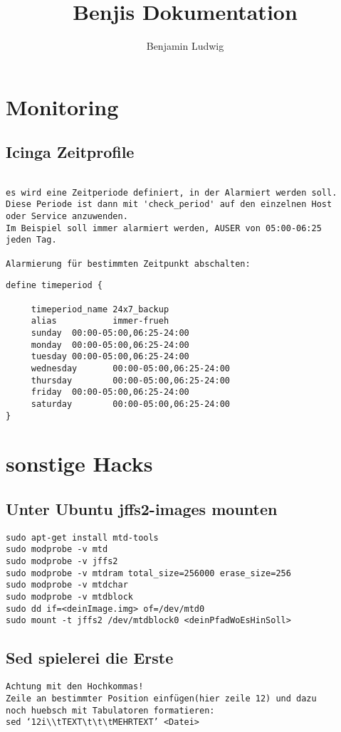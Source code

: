 \documentclass[a4paper,10pt]{report}
\title{Benjis Dokumentation}
\author{Benjamin Ludwig}
\date{}
\begin{document}
 
\maketitle
\tableofcontents
\chapter{Monitoring}
\section{Icinga Zeitprofile}


\begin{verbatim}

es wird eine Zeitperiode definiert, in der Alarmiert werden soll. 
Diese Periode ist dann mit 'check_period' auf den einzelnen Host 
oder Service anzuwenden. 
Im Beispiel soll immer alarmiert werden, AUSER von 05:00-06:25 
jeden Tag. 

Alarmierung für bestimmten Zeitpunkt abschalten:
\end{verbatim}

{\Large
\begin{verbatim}
define timeperiod {

     timeperiod_name 24x7_backup
     alias           immer-frueh
     sunday  00:00-05:00,06:25-24:00
     monday  00:00-05:00,06:25-24:00
     tuesday 00:00-05:00,06:25-24:00
     wednesday       00:00-05:00,06:25-24:00
     thursday        00:00-05:00,06:25-24:00
     friday  00:00-05:00,06:25-24:00
     saturday        00:00-05:00,06:25-24:00
}

\end{verbatim}
}
\chapter{sonstige Hacks}
\section{Unter Ubuntu jffs2-images mounten}
\begin{verbatim}
sudo apt-get install mtd-tools
sudo modprobe -v mtd
sudo modprobe -v jffs2
sudo modprobe -v mtdram total_size=256000 erase_size=256
sudo modprobe -v mtdchar
sudo modprobe -v mtdblock
sudo dd if=<deinImage.img> of=/dev/mtd0
sudo mount -t jffs2 /dev/mtdblock0 <deinPfadWoEsHinSoll>
\end{verbatim}

\section{Sed spielerei die Erste}
\begin{verbatim}
Achtung mit den Hochkommas!
Zeile an bestimmter Position einfügen(hier zeile 12) und dazu 
noch huebsch mit Tabulatoren formatieren:
sed ‘12i\\tTEXT\t\t\tMEHRTEXT’ <Datei>
\end{verbatim}
\end{document}

